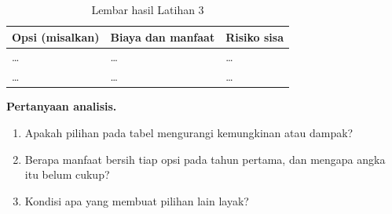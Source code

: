 \begin{table}[!htb]
  \centering\small
  \caption{Lembar hasil Latihan 3}\label{tab:ch05-lat3-hasil}
  \begin{tabularx}{\textwidth}{|>{\raggedright\arraybackslash}X|>{\raggedright\arraybackslash}X|>{\raggedright\arraybackslash}X|}
    \hline
    \textbf{Opsi (misalkan)} & \textbf{Biaya dan manfaat} & \textbf{Risiko sisa} \\ \hline
    \dots & \dots & \dots \\ \hline
    \dots & \dots & \dots \\ \hline
  \end{tabularx}
\end{table}

\textbf{Pertanyaan analisis.}
\begin{enumerate}
  \item Apakah pilihan pada tabel mengurangi kemungkinan atau dampak?
  \item Berapa manfaat bersih tiap opsi pada tahun pertama, dan mengapa angka itu belum cukup?
  \item Kondisi apa yang membuat pilihan lain layak?
\end{enumerate}
